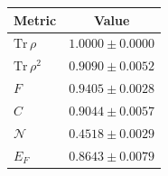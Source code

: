 \begin{tabular}{lc}
\hline
Metric & Value \\
\hline
$\mathrm{Tr}\,\rho$ & $1.0000\pm0.0000$ \\
$\mathrm{Tr}\,\rho^2$ & $0.9090\pm0.0052$ \\
$F$ & $0.9405\pm0.0028$ \\
$C$ & $0.9044\pm0.0057$ \\
$\mathcal{N}$ & $0.4518\pm0.0029$ \\
$E_F$ & $0.8643\pm0.0079$ \\
\hline
\end{tabular}